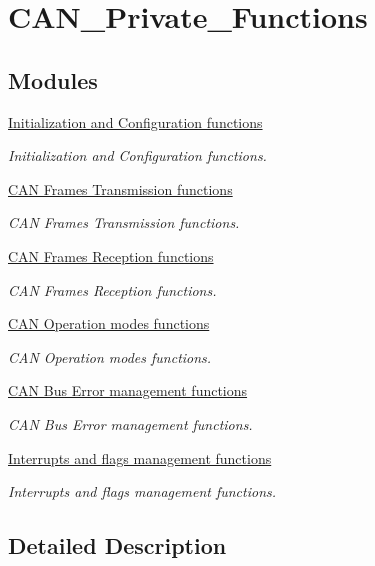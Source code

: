 \hypertarget{group___c_a_n___private___functions}{\section{C\-A\-N\-\_\-\-Private\-\_\-\-Functions}
\label{group___c_a_n___private___functions}
}
\subsection*{Modules}
\begin{DoxyCompactItemize}
\item 
\hyperlink{group___c_a_n___group1}{Initialization and Configuration functions}
\begin{DoxyCompactList}\small\item\em Initialization and Configuration functions. \end{DoxyCompactList}\item 
\hyperlink{group___c_a_n___group2}{C\-A\-N Frames Transmission functions}
\begin{DoxyCompactList}\small\item\em C\-A\-N Frames Transmission functions. \end{DoxyCompactList}\item 
\hyperlink{group___c_a_n___group3}{C\-A\-N Frames Reception functions}
\begin{DoxyCompactList}\small\item\em C\-A\-N Frames Reception functions. \end{DoxyCompactList}\item 
\hyperlink{group___c_a_n___group4}{C\-A\-N Operation modes functions}
\begin{DoxyCompactList}\small\item\em C\-A\-N Operation modes functions. \end{DoxyCompactList}\item 
\hyperlink{group___c_a_n___group5}{C\-A\-N Bus Error management functions}
\begin{DoxyCompactList}\small\item\em C\-A\-N Bus Error management functions. \end{DoxyCompactList}\item 
\hyperlink{group___c_a_n___group6}{Interrupts and flags management functions}
\begin{DoxyCompactList}\small\item\em Interrupts and flags management functions. \end{DoxyCompactList}\end{DoxyCompactItemize}


\subsection{Detailed Description}
